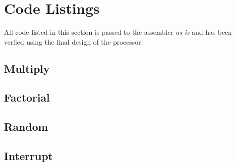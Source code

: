 

\section{Code Listings}
All code listed in this section is passed to the assembler \emph{as is} and has been verfied using the final design of the processor.
\subsection{Multiply}
\label{sec:multiply_appendix}

%
\subsection{Factorial}
\label{sec:factorial_appendix}

\subsection{Random}
\label{sec:random_appendix}

\subsection{Interrupt}
\label{sec:interrupt_appendix}



